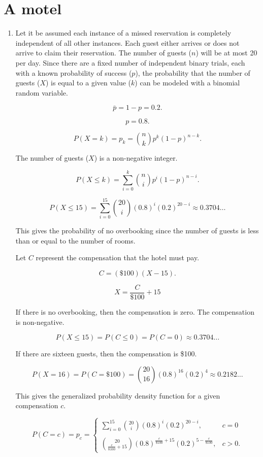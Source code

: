 \documentclass[12pt]{article}
\begin{document}
\section{A motel}
\begin{enumerate}
\item
Let it be assumed each instance of a missed reservation is completely independent of all other instances. Each guest either arrives or does not arrive to claim their reservation. The number of guests ($n$) will be at most 20 per day. Since there are a fixed number of independent binary trials, each with a known probability of success ($p$), the probability that the number of guests ($X$) is equal to a given value ($k$) can be modeled with a binomial random variable. 

\[\bar{p}=1-p=0.2.\]

\[p=0.8.\]

\[P(X=k)=p_k={\binom{n}{k}}p^k(1-p)^{n-k}.\]

The number of guests ($X$) is a non-negative integer.

\[P(X\leq k)=\sum^{k}_{i=0}{\binom{n}{i}p^i(1-p)^{n-i}}.\]

\[P(X\leq 15)=\sum^{15}_{i=0}{\binom{20}{i}(0.8)^i(0.2)^{20-i}\approx 0.3704}\dots\]

This gives the probability of no overbooking since the number of guests is less than or equal to the number of rooms.

Let $C$ represent the compensation that the hotel must pay.

\[C=(\$100)(X-15).\]

\[X=\frac{C}{\$100}+15\]

If there is no overbooking, then the compensation is zero. The compensation is non-negative. 

\[P(X\leq 15)=P(C\leq 0)=P(C=0)\approx 0.3704\dots\]

If there are sixteen guests, then the compensation is \$100.

\[P(X=16)=P(C=\$100)=\binom{20}{16}(0.8)^{16}(0.2)^4\approx 0.2182\dots\]

This gives the generalized probability density function for a given compensation $c$.

\begin{equation*}
P(C=c)=p_c=\begin{cases}
    \sum^{15}_{i=0}{\binom{20}{i}(0.8)^i(0.2)^{20-i}},&c=0\\\\
    \binom{20}{\frac{c}{\$100}+15}(0.8)^{\frac{c}{\$100}+15}(0.2)^{5-\frac{c}{\$100}},&c>0.
\end{cases}
\end{equation*}


\end{enumerate}
\end{document}
